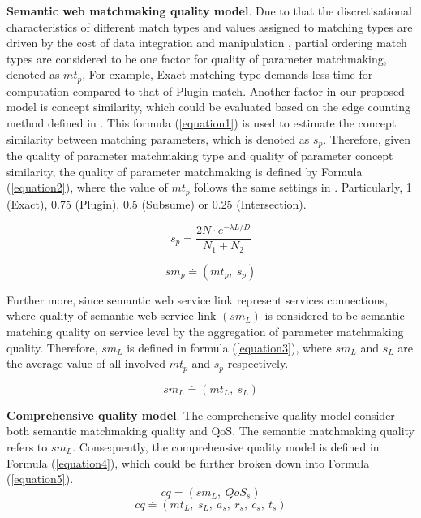 \documentclass{IEEEtran}
\begin{document}
\textbf{Semantic web matchmaking quality model}. Due to that the discretisational characteristics of different match types and values assigned to matching types are driven by the cost of data integration and manipulation \cite{lecue2009optimizing}, partial ordering match types are considered to be one factor for quality of parameter matchmaking, denoted as $mt_{p}$,  For example, Exact matching type demands less time for computation compared to that of Plugin match. Another factor in our proposed model is concept similarity, which could be evaluated based on the edge counting method defined in \cite{shet2012new}. This formula (\ref{equation1}) is used to estimate the concept similarity between matching parameters, which is denoted as $s_{p}$. Therefore, given the quality of parameter matchmaking type and quality of parameter concept similarity, the quality of parameter matchmaking is defined by Formula (\ref{equation2}), where the value of $mt_{p}$ follows the same settings in \cite{lecue2009optimizing}. Particularly, 1 (Exact), 0.75 (Plugin), 0.5 (Subsume) or 0.25 (Intersection). 

\begin{equation}
s_{p}{=} \frac{2N \cdot e^{-\lambda L/D} }{N_{1}+N_{2}}
\label{equation1}
\end{equation}

\begin{equation}
\label{equation2}
sm_{p} \stackrel{.}{=} (mt_ {p}, \  s_ {p})
\end{equation}

Further more, since semantic web service link represent services connections, where quality of semantic web service link $(sm_{L})$ is considered to be semantic matching quality on service level by the aggregation of parameter matchmaking quality. Therefore, $sm_{L}$ is defined in formula (\ref{equation3}), where $sm_{L}$ and $s_{L}$ are the average value of all involved $mt_{p}$ and $s_{p}$ respectively. 

\begin{equation}
\label{equation3}
sm_{L} \stackrel{.}{=} (mt_ {L}, \  s_ {L})
\end{equation}

\textbf{Comprehensive quality model}. The comprehensive quality model consider both semantic matchmaking quality and QoS. The semantic matchmaking quality refers to $sm_{L}$. Consequently, the comprehensive quality model is defined in Formula (\ref{equation4}), which could be further broken down into Formula (\ref{equation5}). 
\begin{equation}
\label{equation4}
cq \stackrel{.}{=} (sm_ {L}, \  QoS_ {s})
\end{equation}
\begin{equation}
\label{equation5}
cq \stackrel{.}{=} (mt_ {L}, \  s_ {L}, \  a_{s},\  r_{s},\  c_{s},\  t_{s})
\end{equation}
\end{document}
